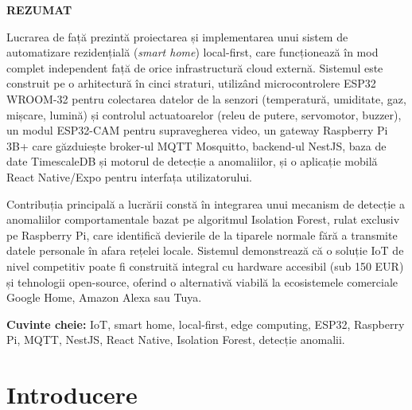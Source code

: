 \documentclass[12pt, twoside, a4paper]{report}
\begin{document}
\begin{center}
{\fontsize{20}{24}\bfseries\MakeUppercase{Rezumat}\par}
\end{center}

\vspace{1cm}

Lucrarea de față prezintă proiectarea și implementarea unui sistem de automatizare
rezidențială (\textit{smart home}) local-first, care funcționează în mod complet independent
față de orice infrastructură cloud externă. Sistemul este construit pe o arhitectură în
cinci straturi, utilizând microcontrolere ESP32 WROOM-32 pentru colectarea datelor de
la senzori (temperatură, umiditate, gaz, mișcare, lumină) și controlul actuatoarelor
(releu de putere, servomotor, buzzer), un modul ESP32-CAM pentru supravegherea video,
un gateway Raspberry Pi 3B+ care găzduiește broker-ul MQTT Mosquitto, backend-ul
NestJS, baza de date TimescaleDB și motorul de detecție a anomaliilor, și o aplicație
mobilă React Native/Expo pentru interfața utilizatorului.

Contribuția principală a lucrării constă în integrarea unui mecanism de detecție a
anomaliilor comportamentale bazat pe algoritmul Isolation Forest, rulat exclusiv pe
Raspberry Pi, care identifică devierile de la tiparele normale fără a transmite datele
personale în afara rețelei locale. Sistemul demonstrează că o soluție IoT de nivel
competitiv poate fi construită integral cu hardware accesibil (sub 150 EUR) și
tehnologii open-source, oferind o alternativă viabilă la ecosistemele comerciale
Google Home, Amazon Alexa sau Tuya.

\textbf{Cuvinte cheie:} IoT, smart home, local-first, edge computing, ESP32,
Raspberry Pi, MQTT, NestJS, React Native, Isolation Forest, detecție anomalii.


\newpage
\thispagestyle{empty}
\tableofcontents


\cleardoublepage
\pagestyle{fancy}


\chapter{Introducere}
\end{document}
